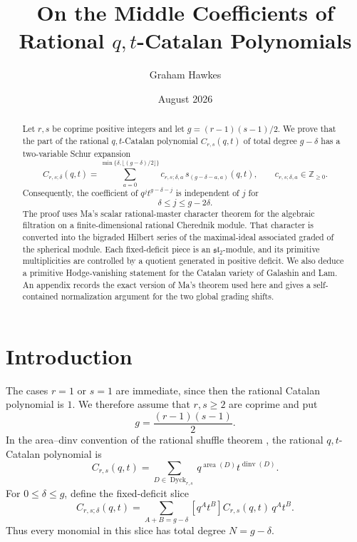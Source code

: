 \documentclass[11pt]{article}
\title{On the Middle Coefficients of Rational $q,t$-Catalan Polynomials}
\author{Graham Hawkes}
\date{August 2026}
\newcommand{\Z}{\mathbb{Z}}
\newcommand{\area}{\operatorname{area}}
\newcommand{\dinv}{\operatorname{dinv}}
\newcommand{\Dyck}{\operatorname{Dyck}}
\begin{document}
\maketitle

\begin{abstract}
Let $r,s$ be coprime positive integers and let
$g=(r-1)(s-1)/2$.  We prove that the part of the rational
$q,t$-Catalan polynomial $C_{r,s}(q,t)$ of total degree $g-\delta$
has a two-variable Schur expansion
\[
 C_{r,s;\delta}(q,t)
 =\sum_{a=0}^{\min\{\delta,\lfloor(g-\delta)/2\rfloor\}}
 c_{r,s;\delta,a}\,s_{(g-\delta-a,a)}(q,t),
 \qquad c_{r,s;\delta,a}\in\Z_{\geq 0}.
\]
Consequently, the coefficient of $q^jt^{g-\delta-j}$ is independent
of $j$ for
\[
 \delta\leq j\leq g-2\delta.
\]
The proof uses Ma's scalar rational-master character theorem for the
algebraic filtration on a finite-dimensional rational Cherednik
module.  That character is converted into the bigraded Hilbert series
of the maximal-ideal associated graded of the spherical module.  Each
fixed-deficit piece is an $\mathfrak{sl}_2$-module, and its primitive
multiplicities are controlled by a quotient generated in positive
deficit.  We also deduce a primitive Hodge-vanishing statement for the
Catalan variety of Galashin and Lam.  An appendix records the exact
version of Ma's theorem used here and gives a self-contained
normalization argument for the two global grading shifts.
\end{abstract}

\section{Introduction}

The cases $r=1$ or $s=1$ are immediate, since then the rational
Catalan polynomial is $1$.  We therefore assume that $r,s\geq2$ are
coprime and put
\[
 g=\frac{(r-1)(s-1)}2.
\]
In the area--dinv convention of the rational shuffle theorem
\cite{Mellit}, the rational $q,t$-Catalan polynomial is
\begin{equation}\label{eq:Catalan-definition}
 C_{r,s}(q,t)
 =\sum_{D\in\Dyck_{r,s}}q^{\area(D)}t^{\dinv(D)}.
\end{equation}
For $0\leq\delta\leq g$, define the fixed-deficit slice
\begin{equation}\label{eq:deficit-slice}
 C_{r,s;\delta}(q,t)
 =\sum_{A+B=g-\delta}
 [q^At^B]C_{r,s}(q,t)\,q^At^B.
\end{equation}
Thus every monomial in this slice has total degree
$N=g-\delta$.
\end{document}

